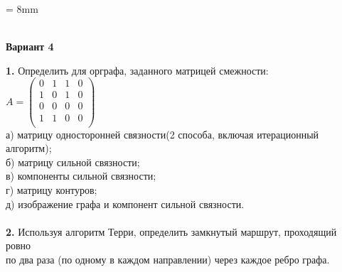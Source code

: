 \documentclass{article}
\author{Andrey Velma}
\begin{document}
\voffset = 8mm
\begin{flushleft}
	\begin{Large}
		\\
		\hspace{8mm}\textbf{Вариант 4}
	\end{Large}
\end{flushleft}
\vspace{8mm}
\large
\hspace{8mm}\textbf{1.} Определить для орграфа, заданного матрицей смежности:
\vspace{5mm}
\\
\hspace*{50mm}
$A =
	\begin{pmatrix}
		0 & 1 & 1 & 0 \\
		1 & 0 & 1 & 0 \\
		0 & 0 & 0 & 0 \\
		1 & 1 & 0 & 0 \\
	\end{pmatrix}$
\vspace{5mm}
\\
\hspace*{12mm} а) матрицу односторонней связности(2 способа, включая итерационный алгоритм);
\\
\hspace*{12mm} б) матрицу сильной связности;
\\
\hspace*{12mm} в) компоненты сильной связности;
\\
\hspace*{12mm} г) матрицу контуров;
\\
\hspace*{12mm} д) изображение графа и компонент сильной связности.
\\
\\
\hspace*{8mm}\textbf{2.} Используя алгоритм Терри, определить замкнутый маршрут, проходящий ровно
\\
\hspace*{12mm} по два раза (по одному в каждом направлении) через каждое ребро графа.
\vspace{5mm}
\\
\begin{center}
\end{center}
\end{document}
